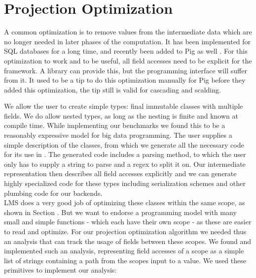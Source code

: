 \section{Projection Optimization}

A common optimization is to remove values from the intermediate data which are no longer needed in later phases of the computation. It has been implemented for SQL databases for a long time, and recently been added to Pig as well . For this optimization to work and to be useful, all field accesses need to be
explicit for the framework. A library can provide this, but the programming interface will suffer from it. It used to
be a tip to do this optimization manually for Pig before they added this optimization, the tip still is valid for
cascading and scalding.

We allow the user to create simple types: final immutable classes with multiple fields. We do allow nested types, as
long as the nesting is finite and known at compile time. While implementing our benchmarks we found this to be a
reasonably expressive model for big data programming. The user supplies a simple description of the classes, from which we generate all the necessary code for its use in \tool. The generated code includes a parsing method, to which the user only has to supply a string to parse and a regex to split it on. Our intermediate representation then describes all field accesses explicitly and we can generate highly specialized code for these types including serialization schemes and other plumbing code for our backends.
\\
LMS does a very good job of optimizing these classes within the same scope, as shown in Section . But we want to endorse a programming model with many small and simple functions - which each have their own scope - as these are easier to read and optimize. For our projection optimization algorithm we needed thus an analysis that can track the usage of fields between these scopes. We found and implemented such an analysis, representing field accesses of a scope as a simple list of strings containing a path from the scopes input to a value. We used these primitives to implement our analysis:

